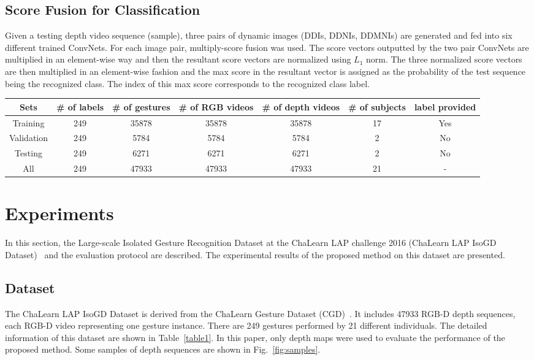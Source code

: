 \documentclass[10pt, a4paper, conference]{IEEEtran}
\begin{document}
\subsection{Score Fusion for Classification}

Given a testing depth video sequence (sample), three pairs of dynamic images (DDIs, DDNIs, DDMNIs) are generated and fed into six different trained ConvNets. For each image pair, multiply-score fusion was used. The score vectors outputted by the two pair ConvNets are multiplied in an element-wise  way and then the resultant score vectors are normalized using $L_{1}$ norm. The three normalized score vectors are then multiplied in an element-wise fashion and the max score in the resultant vector is assigned as the probability of the test sequence being the recognized class. The index of this max score corresponds to the recognized class label.

\begin{table*}[!ht]
\centering
\caption{Information of the ChaLearn LAP IsoGD Dataset. \label{table1}}
\begin{tabular}{|c|c|c|c|c|c|c|}
\hline
Sets &\# of labels &\# of gestures & \# of RGB videos & \# of depth videos & \# of subjects & label provided \\
\hline
Training & 249 & 35878 & 35878 & 35878 & 17 & Yes \\
\hline
Validation & 249 & 5784 & 5784 & 5784 & 2 & No \\
\hline
Testing & 249 &  6271 & 6271 & 6271 & 2 & No \\
\hline
All & 249 & 47933 & 47933 & 47933 & 21 & - \\
\hline
\end{tabular}
\end{table*}

\section{Experiments}
In this section, the Large-scale Isolated Gesture Recognition Dataset at the ChaLearn LAP challenge 2016 (ChaLearn LAP IsoGD Dataset)~\cite{ICPRW2016} and the evaluation protocol are described. The experimental results of the proposed method on this dataset are presented.

\subsection{Dataset}
The ChaLearn LAP IsoGD Dataset is derived from the ChaLearn Gesture Dataset (CGD)~\cite{guyon2014chalearn}. It includes 47933 RGB-D depth sequences, each RGB-D video representing one gesture instance. There are 249 gestures performed by 21 different individuals.  The detailed information of this dataset are shown in Table~\ref{table1}.  In this paper, only depth maps were used to evaluate the performance of the proposed method. Some samples of depth sequences are shown in Fig.~\ref{fig:samples}.
\end{document}
